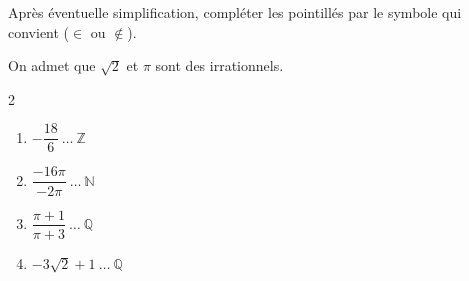 \begin{exo}{}
	Après éventuelle simplification, compléter les pointillés par le symbole qui convient ($\in$ ou $\notin$).

	On admet que $\sqrt{2}$ et $\pi$ sont des irrationnels.
	\begin{multicols}{2}
	\begin{enumerate}[label=\alph*), itemsep=8pt]
		\item $-\dfrac{18}{6} \ \dots \ \mathbb{Z}$
		\item $\dfrac{-16\pi}{-2\pi} \ \dots \ \mathbb{N}$
		\item $\dfrac{\pi+1}{\pi+3} \ \dots \ \mathbb{Q}$
		\item $-3\sqrt{2} + 1 \ \dots \ \mathbb{Q}$
	\end{enumerate}
	\end{multicols}
\end{exo}
